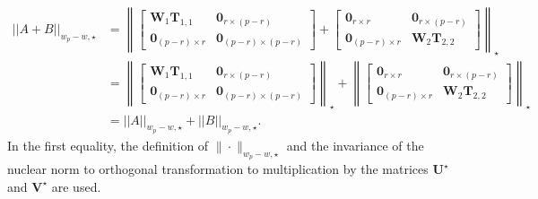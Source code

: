 \documentclass[alpha-refs]{wiley-article}
\begin{document}
\begin{align*}
    ||A+B||_{w_{p} - w, \star}
    &= \left\| \begin{bmatrix}
        \boldsymbol{W}_{1}\boldsymbol{T}_{1,1} & \boldsymbol{0}_{r\times (p-r)} \\
        \boldsymbol{0}_{(p-r) \times r} & \boldsymbol{0}_{(p-r) \times (p-r)} 
    \end{bmatrix} + 
    \begin{bmatrix}
        \boldsymbol{0}_{r \times r} & \boldsymbol{0}_{r\times (p-r)} \\
        \boldsymbol{0}_{(p-r) \times r} & \boldsymbol{W}_{2}\boldsymbol{T}_{2,2}
    \end{bmatrix}
    \right\|_{\star}\\
    &= \left\| \begin{bmatrix}
        \boldsymbol{W}_{1}\boldsymbol{T}_{1,1} & \boldsymbol{0}_{r\times (p-r)} \\
        \boldsymbol{0}_{(p-r) \times r} & \boldsymbol{0}_{(p-r) \times (p-r)} 
    \end{bmatrix}  \right\|_{\star} 
    + \left\|\begin{bmatrix}
        \boldsymbol{0}_{r \times r} & \boldsymbol{0}_{r\times (p-r)} \\
        \boldsymbol{0}_{(p-r) \times r} & \boldsymbol{W}_{2}\boldsymbol{T}_{2,2}
    \end{bmatrix}\right\|_{\star} \\
    &= ||A||_{w_{p} - w, \star}+||B||_{w_{p} - w, \star}.
\end{align*}
In the first equality, the definition of $\|\cdot\|_{w_{p} - w, \star}$ and the invariance of the nuclear norm to orthogonal transformation to multiplication by the matrices $\boldsymbol{U}^{\star}$ and $\boldsymbol{V}^{\star}$ are used. 
\end{document}
